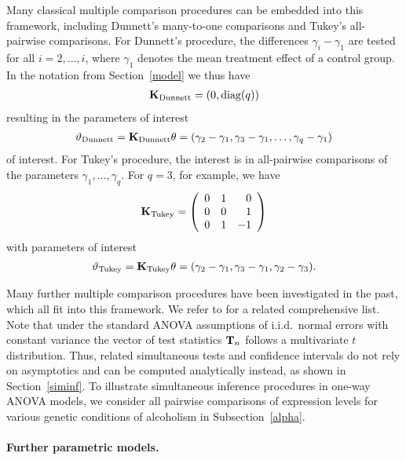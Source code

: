 \documentclass[bimj,fleqn]{w-art}
\begin{document}
Many classical multiple comparison procedures can be embedded into this
framework, including Dunnett's many-to-one comparisons and Tukey's
all-pairwise comparisons. For Dunnett's procedure, the differences $%
\gamma_i - \gamma_1$ are tested for all $i=2, \ldots, i$, where $\gamma_1$
denotes the mean treatment effect of a control group. In the notation from
Section~\ref{model} we thus have 
\begin{eqnarray*}
\mathbf{K}_\text{Dunnett} = (0, \text{diag}(q))
\end{eqnarray*}
resulting in the parameters of interest
\begin{eqnarray*}
\vartheta_\text{Dunnett} = \mathbf{K}_\text{Dunnett} \theta = (\gamma_2 - \gamma_1, \gamma_3 - \gamma_1,
\dots, \gamma_q - \gamma_1)
\end{eqnarray*}
of interest. For Tukey's procedure, the interest is in all-pairwise
comparisons of the parameters $\gamma_1, \dots, \gamma_q$. For $q = 3$, for
example, we have 
\begin{eqnarray*}
\K_\text{Tukey} = \left( 
\begin{array}{rrr}
0 & 1 & 0 \\ 
0 & 0 & 1 \\ 
0 & 1 & -1%
\end{array}
\right)
\end{eqnarray*}
with parameters of interest
\begin{eqnarray*}
\vartheta_\text{Tukey} = \mathbf{K}_\text{Tukey} \theta = (\gamma_2 - \gamma_1, \gamma_3 - \gamma_1,
\gamma_2 - \gamma_3).
\end{eqnarray*}

Many further multiple comparison procedures have been investigated in the
past, which all fit into this framework. We refer to
\cite{BretzGenzHothorn2001} for
a related comprehensive list. Note that under the standard ANOVA assumptions
of i.i.d.~normal errors with constant variance the vector of test statistics 
$\mathbf{T}_n$ follows a multivariate $t$ distribution. Thus, related simultaneous
tests and confidence intervals do not rely on asymptotics and can be
computed analytically instead, as shown in Section~\ref{siminf}.
To illustrate simultaneous inference procedures in one-way ANOVA models, we
consider all pairwise comparisons of expression levels for various genetic
conditions of alcoholism in Subsection~\ref{alpha}.


\paragraph{Further parametric models.}
\end{document}
